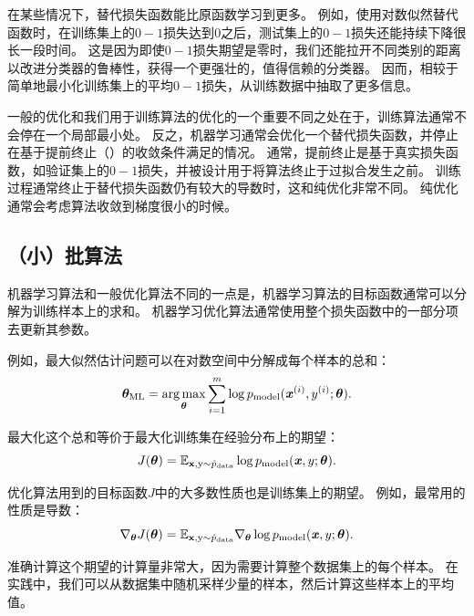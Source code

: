 
在某些情况下，替代损失函数能比原函数学习到更多。
例如，使用对数似然替代函数时，在训练集上的$0-1$损失达到$0$之后，测试集上的$0-1$损失还能持续下降很长一段时间。
这是因为即使$0-1$损失期望是零时，我们还能拉开不同类别的距离以改进分类器的鲁棒性，获得一个更强壮的，值得信赖的分类器。
因而，相较于简单地最小化训练集上的平均$0-1$损失，从训练数据中抽取了更多信息。

一般的优化和我们用于训练算法的优化的一个重要不同之处在于，训练算法通常不会停在一个局部最小处。
反之，机器学习通常会优化一个替代损失函数，并停止在基于提前终止（）的收敛条件满足的情况。
通常，提前终止是基于真实损失函数，如验证集上的$0-1$损失，并被设计用于将算法终止于过拟合发生之前。
训练过程通常终止于替代损失函数仍有较大的导数时，这和纯优化非常不同。
纯优化通常会考虑算法收敛到梯度很小的时候。

\subsection{（小）批算法}
\label{sec:batch_and_minibatch_algorithms}
机器学习算法和一般优化算法不同的一点是，机器学习算法的目标函数通常可以分解为训练样本上的求和。
机器学习优化算法通常使用整个损失函数中的一部分项去更新其参数。

例如，最大似然估计问题可以在对数空间中分解成每个样本的总和：
\begin{equation}
\label{eq:8.4}
    \boldsymbol{\theta}_{\text{ML}} = \underset{\boldsymbol{\theta}}{\arg\max} \sum_{i=1}^m
    \log p_{\text{model}} (\boldsymbol{\mathit{x}}^{(i)}, y^{(i)}; \boldsymbol{\theta}) .
\end{equation}

最大化这个总和等价于最大化训练集在经验分布上的期望：
\begin{equation}
\label{eq:8.5}
    J(\boldsymbol{\theta}) = \mathbb{E}_{\mathbf{x}, \mathrm{y} \sim\hat{p}_\text{data}} 
    \log p_{\text{model}} (\boldsymbol{\mathit{x}},y ; \boldsymbol{\theta}) .
\end{equation}


优化算法用到的目标函数$J$中的大多数性质也是训练集上的期望。
例如，最常用的性质是导数：
\begin{equation}
\label{eq:8.6}
    \nabla_{\boldsymbol{\theta}} J(\boldsymbol{\theta}) = \mathbb{E}_{\mathbf{x}, \mathrm{y} \sim\hat{p}_{\text{data}}} 
    \nabla_{\boldsymbol{\theta}} \log p_{\text{model}} (\boldsymbol{\mathit{x}},y; \boldsymbol{\theta}) .
\end{equation}

准确计算这个期望的计算量非常大，因为需要计算整个数据集上的每个样本。
在实践中，我们可以从数据集中随机采样少量的样本，然后计算这些样本上的平均值。

